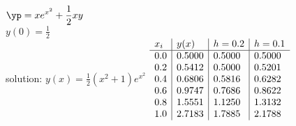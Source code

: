 {
$\displaystyle \yp = xe^{x^2}+\frac{1}{2}xy$\\
$\displaystyle y(0)=\frac{1}{2}$\\
solution: $\displaystyle y(x) = \frac{1}{2}(x^2+1)e^{x^2}$
}
{
	$\begin{array}{l | l | l | l}
		x_i & y(x)   & h = 0.2 & h = 0.1 \\ \hline
		0.0 & 0.5000 & 0.5000  & 0.5000  \\
		0.2 & 0.5412 & 0.5000  & 0.5201  \\
		0.4 & 0.6806 & 0.5816  & 0.6282  \\
		0.6 & 0.9747 & 0.7686  & 0.8622  \\
		0.8 & 1.5551 & 1.1250  & 1.3132  \\
		1.0 & 2.7183 & 1.7885  & 2.1788
	\end{array}$
}